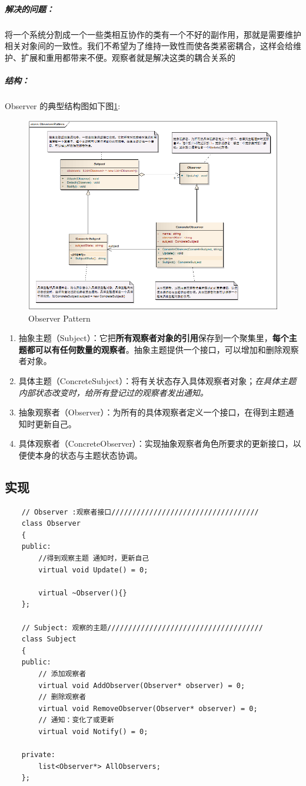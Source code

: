 \documentclass[UTF8,a4paper,12pt]{ctexbook}
\begin{document}
		\subparagraph{解决的问题：}将一个系统分割成一个一些类相互协作的类有一个不好的副作用，那就是需要维护相关对象间的一致性。我们不希望为了维持一致性而使各类紧密耦合，这样会给维护、扩展和重用都带来不便。观察者就是解决这类的耦合关系的
		
		\subparagraph{结构：}Observer 的典型结构图如下图\ref{Observer}:
		\begin{figure}[h]
			\centering
			\includegraphics[scale= 0.7]{Observer.png}
			\caption{Observer Pattern}
			\label{Observer}
		\end{figure}
		
		\begin{enumerate}[itemindent = 1em]
			\item 抽象主题（Subject）：它把\textbf{所有观察者对象的引用}保存到一个聚集里，\textbf{每个主题都可以有任何数量的观察者}。抽象主题提供一个接口，可以增加和删除观察者对象。
			\item 具体主题（ConcreteSubject）：将有关状态存入具体观察者对象；\textit{在具体主题内部状态改变时，给所有登记过的观察者发出通知。}
			\item 抽象观察者（Observer）：为所有的具体观察者定义一个接口，在得到主题通知时更新自己。
			\item 具体观察者（ConcreteObserver）：实现抽象观察者角色所要求的更新接口，以便使本身的状态与主题状态协调。
		\end{enumerate}

	\subsection{实现}	
\begin{lstlisting}
	// Observer :观察者接口///////////////////////////////////
	class Observer
	{
	public:
		//得到观察主题 通知时，更新自己
		virtual void Update() = 0;
	
		virtual ~Observer(){}
	};
	
	// Subject: 观察的主题/////////////////////////////////////
	class Subject
	{
	public: 
		// 添加观察者
		virtual void AddObserver(Observer* observer) = 0;
		// 删除观察者
		virtual void RemoveObserver(Observer* observer) = 0;
		// 通知：变化了或更新
		virtual void Notify() = 0;
	
	private:
		list<Observer*> AllObservers;
	};
\end{lstlisting}
\end{document}
